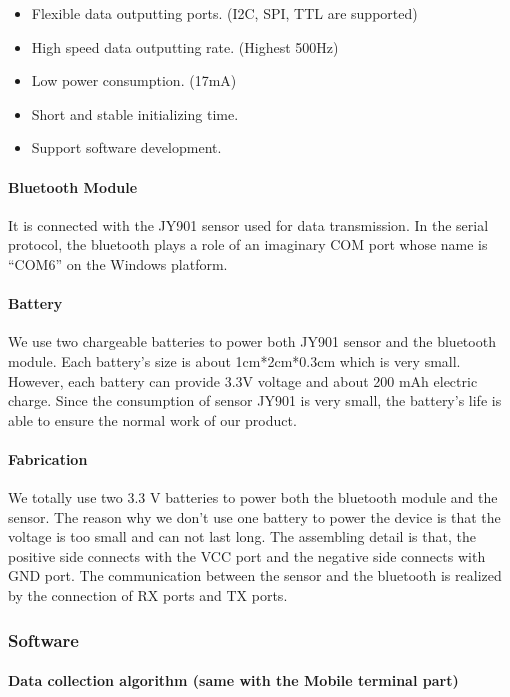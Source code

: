 \begin{itemize}
\item Flexible data outputting ports. (I2C, SPI, TTL are supported)
\item High speed data outputting rate. (Highest 500Hz)
\item Low power consumption. (17mA)
\item Short and stable initializing time. 
\item Support software development. 
\end{itemize}
\paragraph{Bluetooth Module}

It is connected with the JY901 sensor used for data transmission. In the serial
protocol, the bluetooth plays a role of an imaginary COM port whose name is
“COM6” on the Windows platform. 


\paragraph{Battery}

We use two chargeable batteries to power both JY901 sensor and the bluetooth
module. Each battery’s size is about 1cm*2cm*0.3cm which is very small. However,
each battery can provide 3.3V voltage and about 200 mAh electric charge. Since
the consumption of sensor JY901 is very small, the battery’s life is able to
ensure the normal work of our product. 


\paragraph{Fabrication}

We totally use two 3.3 V batteries to power both the bluetooth module and the
sensor. The reason why we don’t use one battery to power the device is that the
voltage is too small and can not last long. The assembling detail is that, the
positive side connects with the VCC port and the negative side connects with GND
port. The communication between the sensor and the bluetooth is realized by the
connection of RX ports and TX ports.  

\subsubsection{Software}
\paragraph{Data collection algorithm (same with the Mobile terminal part)}
